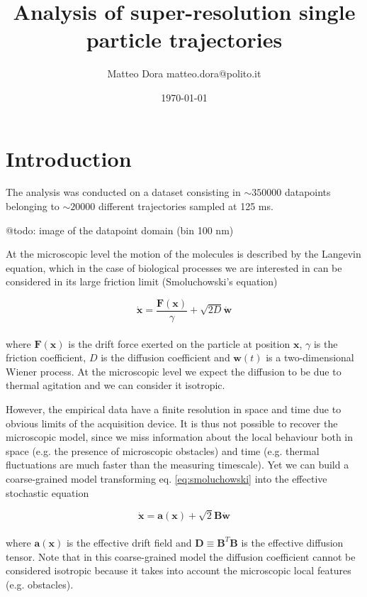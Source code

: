 \documentclass[14pt,a4paper]{article}
\title{Analysis of super-resolution single particle trajectories}
\author{Matteo Dora \mbox{matteo.dora@polito.it}}
\date{\today}
\begin{document}
\maketitle

\begin{abstract}

\end{abstract}

\section{Introduction}

The analysis was conducted on a dataset consisting in $\sim 350 000$ datapoints belonging to $\sim 20 000$ different trajectories sampled at 125 ms.

@todo: image of the datapoint domain (bin 100 nm)

At the microscopic level the motion of the molecules is described by the Langevin equation, which in the case of biological processes we are interested in can be considered in its large friction limit (Smoluchowski's equation)

\begin{equation} \label{eq:smoluchowski}
\dot{\bm{x}} = \frac{\bm{F}(\bm{x})}{\gamma} + \sqrt{2D} \dot{\bm{w}}
\end{equation}
\\
where $\bm{F}(\bm{x})$ is the drift force exerted on the particle at position $\bm{x}$, $\gamma$ is the friction coefficient, $D$ is the diffusion coefficient and $\bm{w}(t)$ is a two-dimensional Wiener process. At the microscopic level we expect the diffusion to be due to thermal agitation and we can consider it isotropic.

However, the empirical data have a finite resolution in space and time due to obvious limits of the acquisition device. It is thus not possible to recover the microscopic model, since we miss information about the local behaviour both in space (e.g. the presence of microscopic obstacles) and time (e.g. thermal fluctuations are much faster than the measuring timescale). Yet we can build a coarse-grained model transforming eq. \ref{eq:smoluchowski} into the effective stochastic equation \cite{hoze2012} \cite{hoze2014}

\begin{equation} \label{eq:coarse-grained}
\dot{\bm{x}} = \bm{a}(\bm{x}) + \sqrt{2}\bm{B} \dot{\bm{w}}
\end{equation}
\\
where $\bm{a}(\bm{x})$ is the effective drift field and $\bm{D} \equiv \bm{B}^T\bm{B}$ is the effective diffusion tensor. Note that in this coarse-grained model the diffusion coefficient cannot be considered isotropic because it takes into account the microscopic local features (e.g. obstacles).
\end{document}
